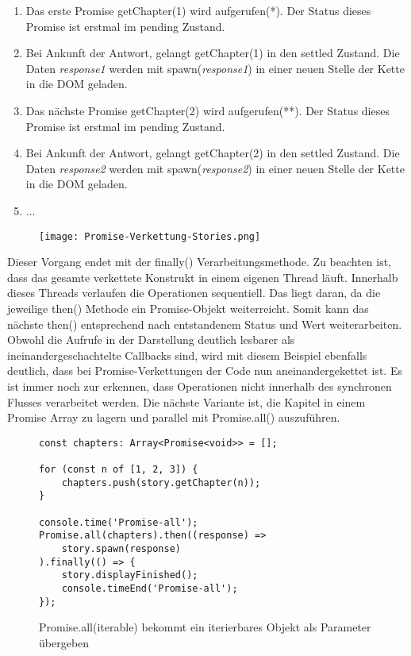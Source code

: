 \begin{enumerate}
    \item Das erste Promise getChapter(1) wird aufgerufen(*). Der Status dieses Promise ist erstmal im pending Zustand.
    \item Bei Ankunft der Antwort, gelangt getChapter(1) in den settled Zustand. Die Daten \textit{response1} werden mit spawn(\textit{response1}) in einer neuen Stelle der Kette in die DOM geladen.
    \item Das nächste Promise getChapter(2) wird aufgerufen(**). Der Status dieses Promise ist erstmal im pending Zustand. 
    \item Bei Ankunft der Antwort, gelangt getChapter(2) in den settled Zustand. Die Daten \textit{response2} werden mit spawn(\textit{response2}) in einer neuen Stelle der Kette in die DOM geladen.
    \item ...
\end{enumerate}

\begin{figure}[H]
\centering
\texttt{[image: Promise-Verkettung-Stories.png]}
\end{figure}

\noindent
Dieser Vorgang endet mit der finally() Verarbeitungsmethode. Zu beachten ist, dass das gesamte verkettete Konstrukt in einem eigenen Thread läuft. Innerhalb dieses Threads verlaufen die Operationen sequentiell. Das liegt daran, da die jeweilige then() Methode ein Promise-Objekt weiterreicht. Somit kann das nächste then() entsprechend nach entstandenem Status und Wert weiterarbeiten. Obwohl die Aufrufe in der Darstellung deutlich lesbarer als ineinandergeschachtelte Callbacks sind, wird mit diesem Beispiel ebenfalls deutlich, dass bei Promise-Verkettungen der Code nun aneinandergekettet ist. Es ist immer noch zur erkennen, dass Operationen nicht innerhalb des synchronen Flusses verarbeitet werden. Die nächste Variante ist, die Kapitel in einem Promise Array zu lagern und parallel mit Promise.all() auszuführen.

\begin{figure}[H]
\begin{lstlisting}[basicstyle=\small]
const chapters: Array<Promise<void>> = [];

for (const n of [1, 2, 3]) {
    chapters.push(story.getChapter(n));
}

console.time('Promise-all');
Promise.all(chapters).then((response) =>
    story.spawn(response)
).finally(() => {
    story.displayFinished();
    console.timeEnd('Promise-all');
});
\end{lstlisting}
\caption{Promise.all(iterable) bekommt ein iterierbares Objekt als Parameter übergeben}
\label{Promise-all-example}
\end{figure}

